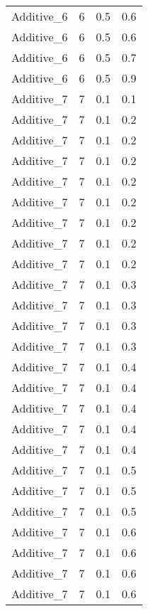 \documentclass{article}
\begin{document}
\begin{longtable}[H]{lrrr}
 Additive\_6 &       6 &   0.5 &            0.6 \\
 Additive\_6 &       6 &   0.5 &            0.6 \\
 Additive\_6 &       6 &   0.5 &            0.7 \\
 Additive\_6 &       6 &   0.5 &            0.9 \\
 Additive\_7 &       7 &   0.1 &            0.1 \\
 Additive\_7 &       7 &   0.1 &            0.2 \\
 Additive\_7 &       7 &   0.1 &            0.2 \\
 Additive\_7 &       7 &   0.1 &            0.2 \\
 Additive\_7 &       7 &   0.1 &            0.2 \\
 Additive\_7 &       7 &   0.1 &            0.2 \\
 Additive\_7 &       7 &   0.1 &            0.2 \\
 Additive\_7 &       7 &   0.1 &            0.2 \\
 Additive\_7 &       7 &   0.1 &            0.2 \\
 Additive\_7 &       7 &   0.1 &            0.3 \\
 Additive\_7 &       7 &   0.1 &            0.3 \\
 Additive\_7 &       7 &   0.1 &            0.3 \\
 Additive\_7 &       7 &   0.1 &            0.3 \\
 Additive\_7 &       7 &   0.1 &            0.4 \\
 Additive\_7 &       7 &   0.1 &            0.4 \\
 Additive\_7 &       7 &   0.1 &            0.4 \\
 Additive\_7 &       7 &   0.1 &            0.4 \\
 Additive\_7 &       7 &   0.1 &            0.4 \\
 Additive\_7 &       7 &   0.1 &            0.5 \\
 Additive\_7 &       7 &   0.1 &            0.5 \\
 Additive\_7 &       7 &   0.1 &            0.5 \\
 Additive\_7 &       7 &   0.1 &            0.6 \\
 Additive\_7 &       7 &   0.1 &            0.6 \\
 Additive\_7 &       7 &   0.1 &            0.6 \\
 Additive\_7 &       7 &   0.1 &            0.6 \\

\end{longtable}
\end{document}

